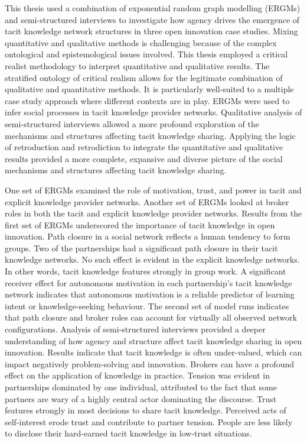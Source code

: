 This thesis used a combination of exponential random graph modelling (ERGMs) and semi-structured interviews to investigate how agency drives the emergence of tacit knowledge network structures in three open innovation case studies. Mixing quantitative and qualitative methods is challenging because of the complex ontological and epistemological issues involved. This thesis employed a critical realist methodology to interpret quantitative and qualitative results. The stratified ontology of critical realism allows for the legitimate combination of qualitative and quantitative methods. It is particularly well-suited to a multiple case study approach where different contexts are in play. ERGMs were used to infer social processes in tacit knowledge provider networks. Qualitative analysis of semi-structured interviews allowed a more profound exploration of the mechanisms and structures affecting tacit knowledge sharing. Applying the logic of retroduction and retrodiction to integrate the quantitative and qualitative results provided a more complete, expansive and diverse picture of the social mechanisms and structures affecting tacit knowledge sharing. \medskip

One set of ERGMs examined the role of motivation, trust, and power in tacit and explicit knowledge provider networks. Another set of ERGMs looked at broker roles in both the tacit and explicit knowledge provider networks. Results from the first set of ERGMs underscored the importance of tacit knowledge in open innovation. Path closure in a social network reflects a human tendency to form groups. Two of the partnerships had a significant path closure in their tacit knowledge networks. No such effect is evident in the explicit knowledge networks. In other words, tacit knowledge features strongly in group work. A significant receiver effect for autonomous motivation in each partnership's tacit knowledge network indicates that autonomous motivation is a reliable predictor of learning intent or knowledge-seeking behaviour. The second set of model runs indicates that path closure and broker roles can account for virtually all observed network configurations. Analysis of semi-structured interviews provided a deeper understanding of how agency and structure affect tacit knowledge sharing in open innovation. Results indicate that tacit knowledge is often under-valued, which can impact negatively problem-solving and innovation. Brokers can have a profound effect on the application of knowledge in practice. Tension was evident in partnerships dominated by one individual, attributed to the fact that some partners are wary of a highly central actor dominating the discourse. Trust features strongly in most decisions to share tacit knowledge. Perceived acts of self-interest erode trust and contribute to partner tension. People are less likely to disclose their hard-earned tacit knowledge in low-trust situations. \medskip

